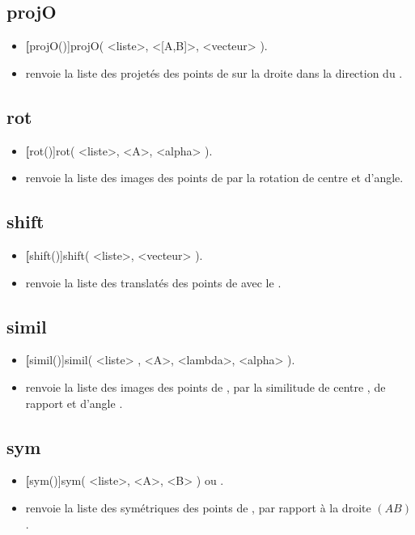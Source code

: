 \subsection{projO}
\begin{itemize}
 \item \util \textbf[projO()]{projO( <liste>, <[A,B]>, <vecteur> )}.
 \item \desc renvoie la liste des projetés des points de  sur la droite  dans la direction du .
\end{itemize}

\subsection{rot}
\begin{itemize}
 \item \util \textbf[rot()]{rot( <liste>, <A>, <alpha> )}.
 \item \desc renvoie la liste des images des points de  par la rotation de centre  et d'angle.
\end{itemize}


\subsection{shift}
\begin{itemize}
 \item \util \textbf[shift()]{shift( <liste>, <vecteur> )}.
 \item \desc renvoie la liste des translatés des points de  avec le .
\end{itemize}


\subsection{simil}
\begin{itemize}
 \item \util \textbf[simil()]{simil( <liste> , <A>, <lambda>, <alpha> )}.
 \item \desc renvoie la liste des images des points de , par la similitude de centre , de rapport  et d'angle .
\end{itemize}

\subsection{sym}
\begin{itemize}
 \item \util \textbf[sym()]{sym( <liste>, <A>, <B> )} ou .
 \item \desc renvoie la liste des symétriques des points de , par rapport à la droite $(AB)$.
\end{itemize}

